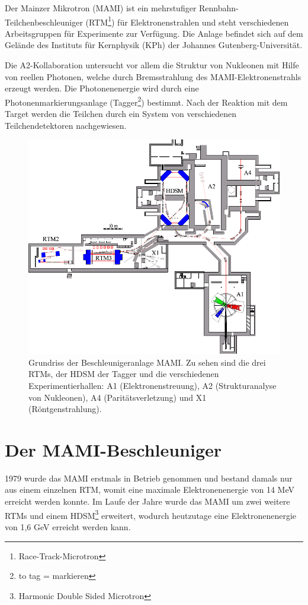 \documentclass[a4paper,11pt,oneside,final,german,openbib,pdftex]{scrbook}
\begin{document}
{Der Mainzer Mikrotron (MAMI) ist ein mehrstufiger Rennbahn-Teilchenbeschleuniger (RTM\footnote{Race-Track-Microtron}) für Elektronenstrahlen und steht verschiedenen Arbeitsgruppen für Experimente zur Verfügung. Die Anlage befindet sich auf dem Gelände des Instituts für Kernphysik (KPh) der Johannes Gutenberg-Universität.

Die A2-Kollaboration untersucht vor allem die Struktur von Nukleonen mit Hilfe von reellen Photonen, welche durch Bremsstrahlung des MAMI-Elektronenstrahls erzeugt werden. Die Photonenenergie wird durch eine Photonenmarkierungsanlage (Tagger\footnote{to tag = markieren}) bestimmt. Nach der Reaktion mit dem Target werden die Teilchen durch ein System von verschiedenen Teilchendetektoren nachgewiesen.

\begin{figure}[h!]
	
	\includegraphics{grundriss}
	\caption[Grundriss der MAMI-Anlage]{Grundriss der Beschleunigeranlage MAMI. Zu sehen sind die drei RTMs, der HDSM der Tagger und die verschiedenen Experimentierhallen: A1 (Elektronenstreuung), A2 (Strukturanalyse von Nukleonen), A4 (Parit\"atsverletzung) und X1 (R\"ontgenstrahlung). \cite{KPh07}}
	\label{fig.grundriss_anlage}
\end{figure}


\section{Der MAMI-Beschleuniger}
1979 wurde das MAMI erstmals in Betrieb genommen und bestand damals nur aus einem einzelnen RTM, womit eine maximale Elektronenenergie von 14 MeV erreicht werden konnte. 
Im Laufe der Jahre wurde das MAMI um zwei weitere RTMs und einem HDSM\footnote{Harmonic Double Sided Microtron} erweitert, wodurch heutzutage eine Elektronenenergie von 1,6 GeV erreicht werden kann.\cite{KPh11G} 
\newline


}
\end{document}
